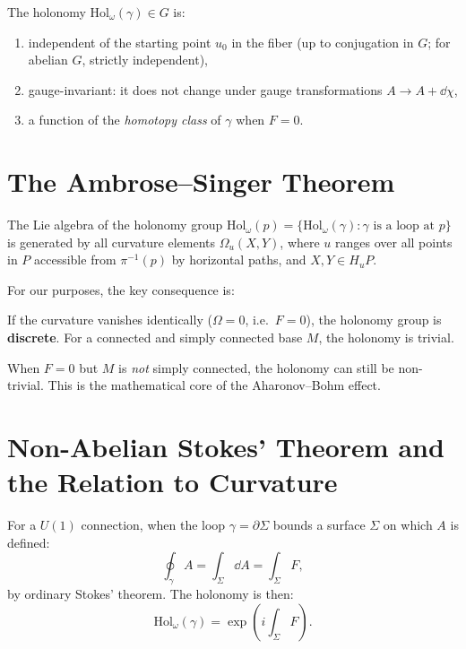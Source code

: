 \begin{proposition}
The holonomy $\mathrm{Hol}_\omega(\gamma) \in G$ is:
\begin{enumerate}
\item independent of the starting point $u_0$ in the fiber (up to conjugation in $G$; for abelian $G$, strictly independent),
\item gauge-invariant: it does not change under gauge transformations $A \to A + \dd\chi$,
\item a function of the \emph{homotopy class} of $\gamma$ when $F = 0$.
\end{enumerate}
\end{proposition}

\section{The Ambrose--Singer Theorem}

\begin{theorem}
The Lie algebra of the holonomy group $\mathrm{Hol}_\omega(p) = \{\mathrm{Hol}_\omega(\gamma) : \gamma \text{ is a loop at } p\}$ is generated by all curvature elements $\Omega_u(X, Y)$, where $u$ ranges over all points in $P$ accessible from $\pi^{-1}(p)$ by horizontal paths, and $X, Y \in H_u P$.
\end{theorem}

For our purposes, the key consequence is:
\begin{corollary}
If the curvature vanishes identically ($\Omega = 0$, i.e.\ $F = 0$), the holonomy group is \textbf{discrete}. For a connected and simply connected base $M$, the holonomy is trivial.
\end{corollary}

When $F = 0$ but $M$ is \emph{not} simply connected, the holonomy can still be non-trivial. This is the mathematical core of the Aharonov--Bohm effect.

\section{Non-Abelian Stokes' Theorem and the Relation to Curvature}

For a $U(1)$ connection, when the loop $\gamma = \partial\Sigma$ bounds a surface $\Sigma$ on which $A$ is defined:
\begin{equation}
\oint_\gamma A = \int_\Sigma \dd A = \int_\Sigma F,
\end{equation}
by ordinary Stokes' theorem. The holonomy is then:
\begin{equation}
\boxed{\mathrm{Hol}_\omega(\gamma) = \exp\!\left(i\int_\Sigma F\right).}
\end{equation}

